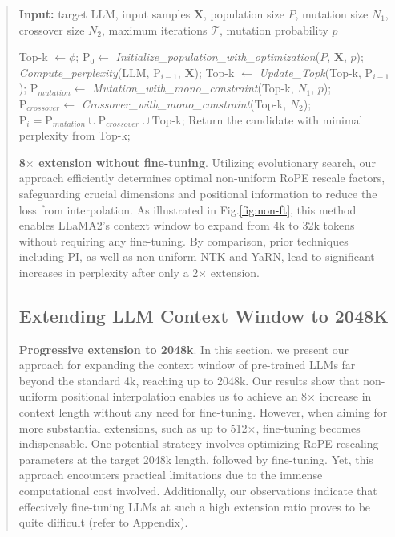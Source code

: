 \begin{abstract}
\begin{algorithm}[t]
	\small
	\caption{The search algorithm}
	\textbf{Input:} target LLM, input samples $\mathbf{X}$, population size $P$, mutation size $N_1$, crossover size $N_2$, maximum iterations $\mathcal{T}$, mutation probability $p$ \\

	\begin{algorithmic}[1]
		\label{alg:search}
		\STATE Top-k $\gets \phi$;	
		\STATE $\text{P}_0 \gets$ \textit{Initialize\_population\_with\_optimization}($P$, $\mathbf{X}$, $p$);
		\STATE \textit{Compute\_perplexity}(LLM, $\text{P}_{i-1}$, $\mathbf{X}$);
		\STATE Top-k $\gets$ \textit{Update\_Topk}(Top-k, $\text{P}_{i-1}$);
		\STATE $\text{P}_{mutation} \gets$ \textit{Mutation\_with\_mono\_constraint}(Top-k, $N_1$, $p$);
		\STATE $\text{P}_{crossover} \gets$ \textit{Crossover\_with\_mono\_constraint}(Top-k, $N_2$);
		\STATE $\text{P}_i = \text{P}_{mutation} \cup \text{P}_{crossover} \cup \text{Top-k}$;
		\ENDFOR
		\STATE Return the candidate with minimal perplexity from Top-k;
	\end{algorithmic}
\end{algorithm}

\textbf{8$\times$ extension without fine-tuning}. Utilizing evolutionary search, our approach efficiently determines optimal non-uniform RoPE rescale factors, safeguarding crucial dimensions and positional information to reduce the loss from interpolation. As illustrated in Fig.\ref{fig:non-ft}, this method enables LLaMA2’s context window to expand from 4k to 32k tokens without requiring any fine-tuning. By comparison, prior techniques including PI, as well as non-uniform NTK and YaRN, lead to significant increases in perplexity after only a 2$\times$ extension.

\subsection{Extending LLM Context Window to 2048K}
\label{sec:extendto2048k}

\textbf{Progressive extension to 2048k}. In this section, we present our approach for expanding the context window of pre-trained LLMs far beyond the standard 4k, reaching up to 2048k. Our results show that non-uniform positional interpolation enables us to achieve an 8$\times$ increase in context length without any need for fine-tuning. However, when aiming for more substantial extensions, such as up to 512$\times$, fine-tuning becomes indispensable. One potential strategy involves optimizing RoPE rescaling parameters at the target 2048k length, followed by fine-tuning. Yet, this approach encounters practical limitations due to the immense computational cost involved. Additionally, our observations indicate that effectively fine-tuning LLMs at such a high extension ratio proves to be quite difficult (refer to Appendix).


\end{abstract}
